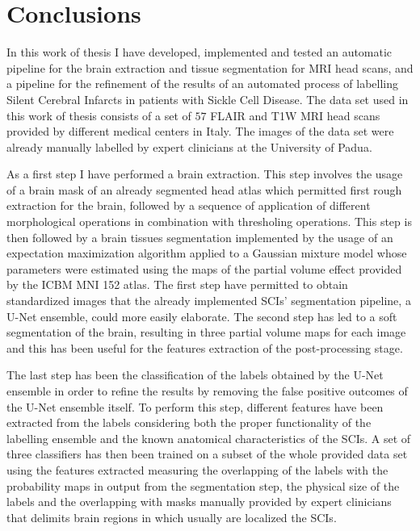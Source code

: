 \documentclass{standalone}
\begin{document}
\chapter*{Conclusions}

In this work of thesis I have developed, implemented and tested an automatic pipeline for the brain extraction and tissue segmentation for MRI head scans, and a pipeline for the refinement of the results of an automated process of labelling Silent Cerebral Infarcts in patients with Sickle Cell Disease.
The data set used in this work of thesis consists of a set of $57$ FLAIR and T1W MRI head scans provided by different medical centers in Italy. The images of the data set were already manually labelled by expert clinicians at the University of Padua.

As a first step I have performed a brain extraction. This step involves the usage of a brain mask of an already segmented head atlas which permitted first rough extraction for the brain, followed by a sequence of application of different morphological operations in combination with thresholing operations.
This step is then followed by a brain tissues segmentation implemented by the usage of an expectation maximization algorithm applied to a Gaussian mixture model whose parameters were estimated using the maps of the partial volume effect provided by the ICBM MNI 152 atlas.
The first step have permitted to obtain standardized images that the already implemented SCIs' segmentation pipeline, a U-Net ensemble, could more easily elaborate.
The second step has led to a soft segmentation of the brain, resulting in three partial volume maps for each image and this has been useful for the features extraction of the post-processing stage.

The last step has been the classification of the labels obtained by the U-Net ensemble in order to refine the results by removing the false positive outcomes of the U-Net ensemble itself.
To perform this step, different features have been extracted from the labels considering both the proper functionality of the labelling ensemble and the known anatomical characteristics of the SCIs.
A set of three classifiers has then been trained on a subset of the whole provided data set using the features extracted measuring the overlapping of the labels with the probability maps in output from the segmentation step, the physical size of the labels and the overlapping with masks manually provided by expert clinicians that delimits brain regions in which usually are localized the SCIs.
\end{document}
